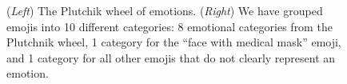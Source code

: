 \documentclass[11pt]{article}
\begin{document}
\begin{figure}
    \centering
    \label{fig:plu_wheel}
    \caption{
        (\emph{Left}) 
        The Plutchik wheel of emotions.
        (\emph{Right}) 
        We have grouped emojis into 10 different categories:
        8 emotional categories from the Plutchnik wheel,
        1 category for the ``face with medical mask'' emoji,
        and 1 category for all other emojis that do not clearly represent an emotion.
}
\end{figure}
\end{document}
